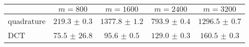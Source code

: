 \centering
\renewcommand{\arraystretch}{1.2}
\begin{tabular}{@{}lcccc@{}}
\toprule
 & $m=800$ & $m=1600$ & $m=2400$ & $m=3200$\\
\midrule
quadrature & $219.3$ $\pm$ $0.3$ & $1377.8$ $\pm$ $1.2$ & $793.9$ $\pm$ $0.4$ & $1296.5$ $\pm$ $0.7$ \\
DCT & $75.5$ $\pm$ $26.8$ & $95.6$ $\pm$ $0.5$ & $129.0$ $\pm$ $0.3$ & $160.5$ $\pm$ $0.3$ \\
\bottomrule
\end{tabular}
